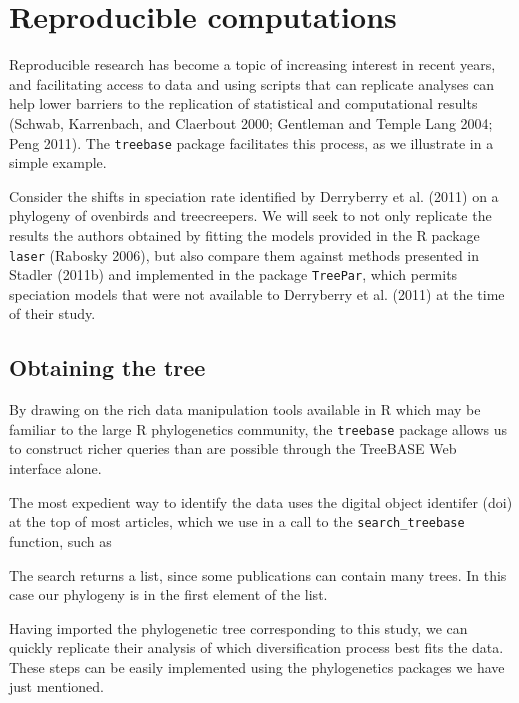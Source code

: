 \section{Reproducible computations}

Reproducible research has become a topic of increasing interest in
recent years, and facilitating access to data and using scripts that can
replicate analyses can help lower barriers to the replication of
statistical and computational results (Schwab, Karrenbach, and Claerbout
2000; Gentleman and Temple Lang 2004; Peng 2011). The \texttt{treebase}
package facilitates this process, as we illustrate in a simple example.

Consider the shifts in speciation rate identified by Derryberry et al.
(2011) on a phylogeny of ovenbirds and treecreepers. We will seek to not
only replicate the results the authors obtained by fitting the models
provided in the R package \texttt{laser} (Rabosky 2006), but also
compare them against methods presented in Stadler (2011b) and
implemented in the package \texttt{TreePar}, which permits speciation
models that were not available to Derryberry et al. (2011) at the time
of their study.

\subsection{Obtaining the tree}

By drawing on the rich data manipulation tools available in R which may
be familiar to the large R phylogenetics community, the
\texttt{treebase} package allows us to construct richer queries than are
possible through the TreeBASE Web interface alone.

The most expedient way to identify the data uses the digital object
identifer (doi) at the top of most articles, which we use in a call to
the \texttt{search\_treebase} function, such as

\begin{Shaded}
\begin{Highlighting}[]
\NormalTok{(}\NormalTok{, }\NormalTok{) }
\end{Highlighting}
\end{Shaded}
The search returns a list, since some publications can contain many
trees. In this case our phylogeny is in the first element of the list.

Having imported the phylogenetic tree corresponding to this study, we
can quickly replicate their analysis of which diversification process
best fits the data. These steps can be easily implemented using the
phylogenetics packages we have just mentioned.

